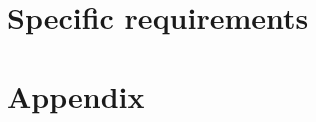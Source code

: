 \documentclass[]{book}
\begin{document}
\tableofcontents





\chapter{Specific requirements}

\chapter{Appendix}



\end{document}
